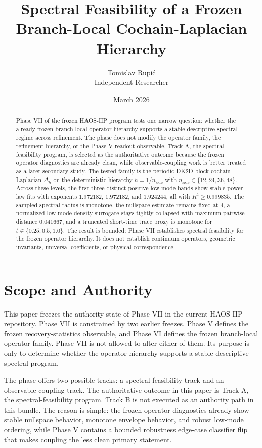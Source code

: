 \documentclass[11pt]{article}
\title{Spectral Feasibility of a Frozen Branch-Local Cochain-Laplacian Hierarchy}
\author{Tomislav Rupi\'c \\ Independent Researcher}
\date{March 2026}
\begin{document}
\maketitle

\begin{abstract}
Phase VII of the frozen HAOS-IIP program tests one narrow question: whether the already frozen branch-local operator hierarchy supports a stable descriptive spectral regime across refinement. The phase does not modify the operator family, the refinement hierarchy, or the Phase V readout observable. Track A, the spectral-feasibility program, is selected as the authoritative outcome because the frozen operator diagnostics are already clean, while observable-coupling work is better treated as a later secondary study. The tested family is the periodic DK2D block cochain Laplacian $\Delta_h$ on the deterministic hierarchy $h = 1/n_{\mathrm{side}}$ with $n_{\mathrm{side}} \in \{12,24,36,48\}$. Across these levels, the first three distinct positive low-mode bands show stable power-law fits with exponents $1.972182$, $1.972182$, and $1.924244$, all with $R^2 \ge 0.999835$. The sampled spectral radius is monotone, the nullspace estimate remains fixed at $4$, a normalized low-mode density surrogate stays tightly collapsed with maximum pairwise distance $0.041667$, and a truncated short-time trace proxy is monotone for $t \in \{0.25,0.5,1.0\}$. The result is bounded: Phase VII establishes spectral feasibility for the frozen operator hierarchy. It does not establish continuum operators, geometric invariants, universal coefficients, or physical correspondence.
\end{abstract}

\section{Scope and Authority}

This paper freezes the authority state of Phase VII in the current HAOS-IIP repository. Phase VII is constrained by two earlier freezes. Phase V defines the frozen recovery-statistics observable, and Phase VI defines the frozen branch-local operator family. Phase VII is not allowed to alter either of them. Its purpose is only to determine whether the operator hierarchy supports a stable descriptive spectral program.

The phase offers two possible tracks: a spectral-feasibility track and an observable-coupling track. The authoritative outcome in this paper is Track A, the spectral-feasibility program. Track B is not executed as an authority path in this bundle. The reason is simple: the frozen operator diagnostics already show stable nullspace behavior, monotone envelope behavior, and robust low-mode ordering, while Phase V contains a bounded robustness edge-case classifier flip that makes coupling the less clean primary statement.
\end{document}
